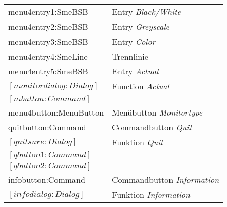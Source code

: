 \begin{tabular}{|l|l|}
\hspace{1.0cm}                        menu4entry1:SmeBSB         &     Entry {\it Black/White}              \\
\hspace{1.0cm}                        menu4entry2:SmeBSB         &     Entry {\it Greyscale}                \\
\hspace{1.0cm}                        menu4entry3:SmeBSB         &     Entry {\it Color}                    \\
\hspace{1.0cm}                        menu4entry4:SmeLine        &     Trennlinie                        \\
\hspace{1.0cm}                        menu4entry5:SmeBSB         &     Entry {\it Actual}                    \\
\hspace{0.5cm}                $[monitordialog:Dialog]$             &     Function {\it Actual}                  \\
\hspace{1.0cm}                        $[mbutton:Command]$          &                                      \\
\hspace{0.5cm}                menu4button:MenuButton             &     Men\"ubutton {\it Monitortype}         \\
\hspace{0.5cm}                quitbutton:Command                 &     Commandbutton {\it Quit}              \\
\hspace{0.5cm}                $[quitsure:Dialog]$                  &     Funktion {\it Quit}                     \\
\hspace{1.0cm}                        $[qbutton1:Command]$         &                                         \\
\hspace{1.0cm}                        $[qbutton2:Command]$         &                                          \\
\hspace{0.5cm}                infobutton:Command                 &     Commandbutton {\it Information}           \\
\hspace{0.5cm}                $[infodialog:Dialog]$                &     Funktion {\it Information}              \\

\end{tabular}
